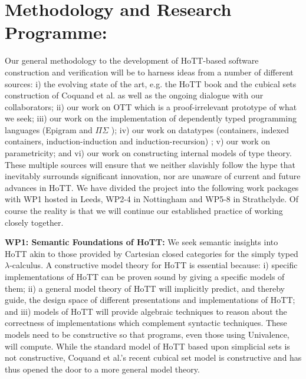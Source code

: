 \documentclass[a4paper,11pt]{article}
\begin{document}


\section{Methodology and Research Programme:}



Our general methodology to the development of HoTT-based software
construction and verification will be to harness ideas from a number
of different sources: i) the evolving state of the art, e.g. the HoTT
book and the cubical sets construction of Coquand et al. as well as
the ongoing dialogue with our collaborators; ii) our work on OTT which
is a proof-irrelevant prototype of what we seek; iii) our work on the
implementation of dependently typed programming languages (Epigram and
$\Pi\Sigma$ \cite{alti:pisigma-new,alti:checking}); iv) our work on datatypes (containers, indexed
containers, induction-induction and induction-recursion) 
\cite{alti:fossacs03,alti:tlca03,alti:icalp04,alti:jpartial,alti:mpc04,alti:cont-tcs,alti:regular,alti:cats07,alti:jcats07,alti:lics09,
alti:catind2}
 ; v) our work
on parametricity; and vi) our work on constructing internal models of
type theory. These multiple sources will ensure that we neither
slavishly follow the hype that inevitably surrounds significant
innovation, nor are unaware of current and future advances in HoTT. We
have divided the project into the following work packages with WP1
hosted in Leeds, WP2-4 in Nottingham and WP5-8 in Strathclyde. Of course
the reality is that we will continue our established practice of
working closely together.


{\bf WP1: Semantic Foundations of HoTT:}  We
seek semantic insights into HoTT akin to those provided by Cartesian
closed categories for the simply typed
$\lambda$-calculus.  A constructive model theory for HoTT is essential because: i)
specific implementations of HoTT can be proven sound by giving a specific
models of them; ii) 
a general model theory of HoTT will implicitly predict, and thereby
guide, the design space of different presentations and implementations
of HoTT; and iii) models of HoTT will provide algebraic techniques to
reason about the correctness of implementations which complement
syntactic techniques. These models need to be constructive so that
programs, even those using Univalence, will compute. While the
standard model of HoTT based upon simplicial sets is not constructive,
Coquand et al.'s recent cubical set model is constructive and 
has thus opened the door to a more general model theory.
\end{document}
